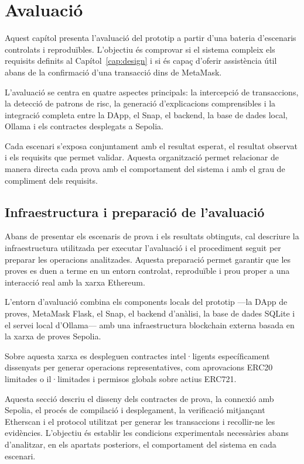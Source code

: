 \section{Avaluació}
\label{cap:evaluation}

Aquest capítol presenta l’avaluació del prototip a partir d’una bateria d’escenaris controlats i reproduïbles. L’objectiu és comprovar si el sistema compleix els requisits definits al Capítol~\ref{cap:design} i si és capaç d’oferir assistència útil abans de la confirmació d’una transacció dins de MetaMask.

L’avaluació se centra en quatre aspectes principals: la intercepció de transaccions, la detecció de patrons de risc, la generació d’explicacions comprensibles i la integració completa entre la DApp, el Snap, el backend, la base de dades local, Ollama i els contractes desplegats a Sepolia.

Cada escenari s’exposa conjuntament amb el resultat esperat, el resultat observat i els requisits que permet validar. Aquesta organització permet relacionar de manera directa cada prova amb el comportament del sistema i amb el grau de compliment dels requisits.

\subsection{Infraestructura i preparació de l’avaluació}

Abans de presentar els escenaris de prova i els resultats obtinguts, cal descriure la infraestructura utilitzada per executar l’avaluació i el procediment seguit per preparar les operacions analitzades. Aquesta preparació permet garantir que les proves es duen a terme en un entorn controlat, reproduïble i prou proper a una interacció real amb la xarxa Ethereum. 

L’entorn d’avaluació combina els components locals del prototip —la DApp de proves, MetaMask Flask, el Snap, el backend d’anàlisi, la base de dades SQLite i el servei local d’Ollama— amb una infraestructura blockchain externa basada en la xarxa de proves Sepolia. 

Sobre aquesta xarxa es despleguen contractes intel·ligents específicament dissenyats per generar operacions representatives, com aprovacions ERC20 limitades o il·limitades i permisos globals sobre actius ERC721. 

Aquesta secció descriu el disseny dels contractes de prova, la connexió amb Sepolia, el procés de compilació i desplegament, la verificació mitjançant Etherscan i el protocol utilitzat per generar les transaccions i recollir-ne les evidències. L’objectiu és establir les condicions experimentals necessàries abans d’analitzar, en els apartats posteriors, el comportament del sistema en cada escenari.


